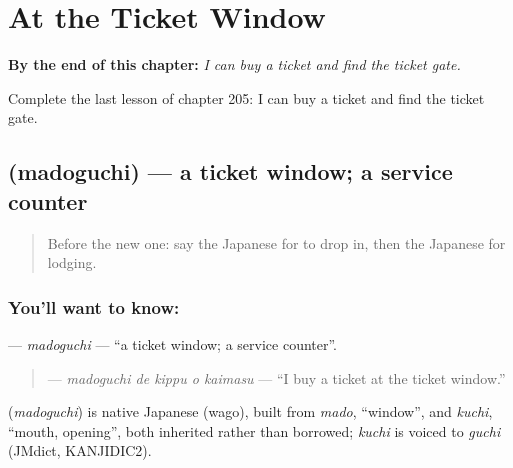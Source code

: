 
\chapter{At the Ticket Window}
\label{ch:ja-at-the-ticket-window}

\begin{chapteropening}
\textbf{By the end of this chapter:} \emph{I can buy a ticket and find the ticket gate.}

Complete the last lesson of chapter 205: I can buy a ticket and find the ticket gate.
\end{chapteropening}

\section[\texorpdfstring{\ja{まどぐち} (madoguchi)}{まどぐち (madoguchi)}]{ (madoguchi) — a ticket window; a service counter}

\label{lesson:JA-C205-madoguchi}



\begin{quote}
Before the new one: say the Japanese for to drop in, then the Japanese for lodging.
\end{quote}

\subsection*{You'll want to know: }
\textbf{} — \emph{madoguchi} — \textquotedblleft{}a ticket window; a service counter\textquotedblright{}.

\begin{quote}
\textbf{  } — \emph{madoguchi de kippu o kaimasu} — \textquotedblleft{}I buy a ticket at the ticket window.\textquotedblright{}
\end{quote}

\begin{cousinweb}
\textbf{} (\emph{madoguchi}) is native Japanese (wago), built from \emph{mado}, \textquotedblleft{}window\textquotedblright{}, and \emph{kuchi}, \textquotedblleft{}mouth, opening\textquotedblright{}, both inherited rather than borrowed; \emph{kuchi} is voiced to \emph{guchi} (JMdict, KANJIDIC2).
\end{cousinweb}

